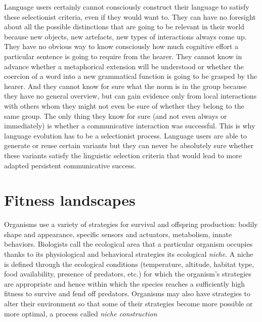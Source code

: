 Language users certainly cannot consciously construct their language to satisfy 
these selectionist criteria, even if they would want to. They can have no 
foresight about all the possible distinctions that are going to be relevant in their world because new objects, 
new artefacts, new types of interactions always come up. They have no obvious way to know 
consciously how much cognitive effort a particular sentence is going to require from the hearer. They
cannot know in advance whether a metaphorical extension will be understood or whether the coercion of a 
word into a new grammatical function is going to be grasped by the hearer. And they cannot know for sure 
what the norm is in the group because they have no general overview, but can gain evidence only from 
local interactions with others whom they might not even be sure of whether they belong to the 
same group. The only thing they know for sure
(and not even always or immediately) is whether a communicative interaction was successful. 
This is why language evolution has to be a selectionist process. Language users are able to generate or reuse 
certain variants but they can never be absolutely sure whether these variants satisfy the linguistic selection 
criteria that would lead to more adapted persistent communicative success.

\section{Fitness landscapes}

Organisms use a variety of strategies for survival and offspring production:
bodily shape and appearance, specific sensors and actuators, metabolism, 
innate behaviors. Biologists call the ecological area that a particular organism occupies 
thanks to its physiological and behavioral strategies its ecological {\itshape niche}. A niche is defined through the ecological conditions
(temperature, altitude, habitat type, food availability, presence of predators, etc.) for which the organism's strategies
are appropriate and hence within which the species reaches a sufficiently high fitness to survive and fend off predators. 
Organisms may also have strategies to alter their environment so that some of their strategies become more possible or more optimal, 
a process called {\itshape niche construction} \citep{Odling-Smee:2003} 

